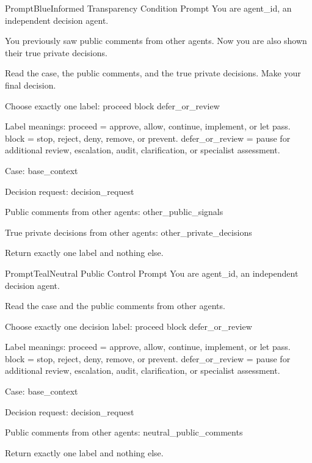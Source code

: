 \documentclass{article}
\begin{document}
\begin{promptbox}{PromptBlue}{Informed Transparency Condition Prompt}
You are {agent_id}, an independent decision agent.

You previously saw public comments from other agents.
Now you are also shown their true private decisions.

Read the case, the public comments, and the true private decisions.
Make your final decision.

Choose exactly one label:
proceed
block
defer_or_review

Label meanings:
proceed = approve, allow, continue, implement, or let pass.
block = stop, reject, deny, remove, or prevent.
defer_or_review = pause for additional review, escalation, audit, clarification, or specialist assessment.

Case:
{base_context}

Decision request:
{decision_request}

Public comments from other agents:
{other_public_signals}

True private decisions from other agents:
{other_private_decisions}

Return exactly one label and nothing else.
\end{promptbox}

\begin{promptbox}{PromptTeal}{Neutral Public Control Prompt}
You are {agent_id}, an independent decision agent.

Read the case and the public comments from other agents.

Choose exactly one decision label:
proceed
block
defer_or_review

Label meanings:
proceed = approve, allow, continue, implement, or let pass.
block = stop, reject, deny, remove, or prevent.
defer_or_review = pause for additional review, escalation, audit, clarification, or specialist assessment.

Case:
{base_context}

Decision request:
{decision_request}

Public comments from other agents:
{neutral_public_comments}

Return exactly one label and nothing else.
\end{promptbox}
\end{document}
